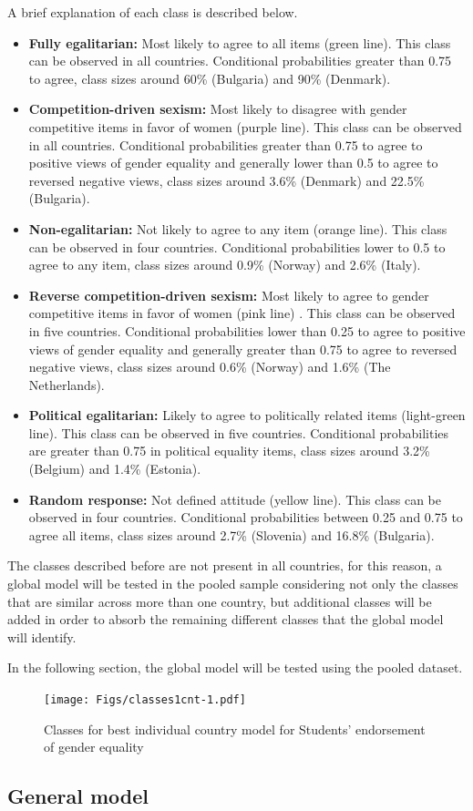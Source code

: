 \documentclass[12pt,a4paper,oneside]{reedthesis}
\begin{document}
A brief explanation of each class is described below.
\begin{itemize}
\item
  \textbf{Fully egalitarian:} Most likely to agree to all items (green line). This class can be observed in all countries. Conditional probabilities greater than 0.75 to agree, class sizes around 60\% (Bulgaria) and 90\% (Denmark).
\item
  \textbf{Competition-driven sexism:} Most likely to disagree with gender competitive items in favor of women (purple line). This class can be observed in all countries. Conditional probabilities greater than 0.75 to agree to positive views of gender equality and generally lower than 0.5 to agree to reversed negative views, class sizes around 3.6\% (Denmark) and 22.5\% (Bulgaria).
\item
  \textbf{Non-egalitarian:} Not likely to agree to any item (orange line). This class can be observed in four countries. Conditional probabilities lower to 0.5 to agree to any item, class sizes around 0.9\% (Norway) and 2.6\% (Italy).
\item
  \textbf{Reverse competition-driven sexism:} Most likely to agree to gender competitive items in favor of women (pink line) . This class can be observed in five countries. Conditional probabilities lower than 0.25 to agree to positive views of gender equality and generally greater than 0.75 to agree to reversed negative views, class sizes around 0.6\% (Norway) and 1.6\% (The Netherlands).
\item
  \textbf{Political egalitarian:} Likely to agree to politically related items (light-green line). This class can be observed in five countries. Conditional probabilities are greater than 0.75 in political equality items, class sizes around 3.2\% (Belgium) and 1.4\% (Estonia).
\item
  \textbf{Random response:} Not defined attitude (yellow line). This class can be observed in four countries. Conditional probabilities between 0.25 and 0.75 to agree all items, class sizes around 2.7\% (Slovenia) and 16.8\% (Bulgaria).
\end{itemize}
The classes described before are not present in all countries, for this reason, a global model will be tested in the pooled sample considering not only the classes that are similar across more than one country, but additional classes will be added in order to absorb the remaining different classes that the global model will identify.

In the following section, the global model will be tested using the pooled dataset.
\begin{figure}
\centering
\texttt{[image: Figs/classes1cnt-1.pdf]}
\caption{\label{fig:classes1cnt}Classes for best individual country model for Students' endorsement of gender equality}
\end{figure}
\hypertarget{general-model}{%
\subsection{General model}\label{general-model}}
\end{document}
